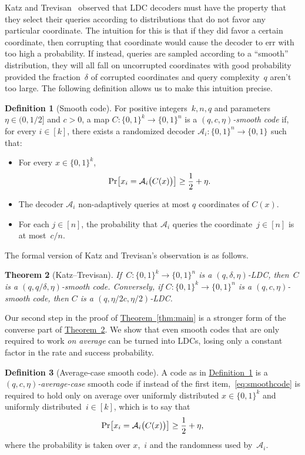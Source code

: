 \documentclass[11pt]{article}
\numberwithin{equation}{section}
\newtheorem{theorem}{Theorem}[section]
\theoremstyle{definition}
\newtheorem{definition}[theorem]{Definition}
\theoremstyle{plain}
\newcommand{\expref}[2]{\hyperref[#2]{#1~\ref{#2}}}
\newcommand{\bset}[1]{\{0,1\}^{#1}} %
\renewcommand{\Pr}{\mbox{\rm Pr}}
\newcommand{\cA}{{\mathcal A}}
\newcommand{\beq}{\begin{equation}}
\newcommand{\eeq}{\end{equation}}
\newcommand{\beqn}{\begin{equation*}}
\newcommand{\eeqn}{\end{equation*}}
\begin{document}
Katz and Trevisan~\cite{Katz:2000} observed that LDC decoders must have the property that they select their queries according to distributions that do not favor any particular coordinate.
The intuition for this is that if they did favor a certain coordinate, then corrupting that coordinate would cause the decoder to err with too high a probability.
If instead, queries are sampled according to a ``smooth'' distribution, they will all fall on uncorrupted coordinates with good probability provided the fraction~$\delta$ of corrupted coordinates %
and query complexity~$q$ aren't too large.
The following definition allows us to make this intuition precise.

\begin{definition}[Smooth code]\label{def:smoothcode}
For positive integers~$k, n,q$ and parameters $\eta\in (0,1/2]$ and $c>0$, a map $C: \bset{k}\to\bset{n}$ is a \emph{$(q,c,\eta)$-smooth code} if, for every $i\in[k]$, there exists a randomized decoder $\mathcal A_i:\bset{n}\to\bset{}$ such that:
\begin{itemize}
\item For every $x\in\bset{k}$,
	\beq\label{eq:smoothcode}
	\Pr\big[x_i=\cA_i\big(C(x)\big)\big]\ge \frac{1}{2}+\eta.
	\eeq
\item The decoder $\mathcal{A}_i$ non-adaptively queries at most $q$ coordinates of $C(x)$.
\item For each $j\in[n]$, the probability that $\mathcal A_i$ queries the coordinate~$j\in[n]$ is at most~$c/n$.
\end{itemize}
\end{definition}

The formal version of Katz and Trevisan's observation is as follows.

%
%
\begin{theorem}[Katz--Trevisan]
\label{thm:ldctosmooth}
If~$C:\bset{k}\to\bset{n}$ is a $(q,\delta,\eta)$-LDC, 
then~$C$ is
%
%
a $(q,q/\delta,\eta)$-smooth code. 
Conversely, if $C:\bset{k}\to\bset{n}$ is a $(q,c,\eta)$-smooth code,
then $C$ is
%
%
a $(q,\eta/2c,\eta/2)$-LDC. 
\end{theorem}

Our second step in the proof of \expref{Theorem}{thm:main} is a stronger form of the converse part of \expref{Theorem}{thm:ldctosmooth}. We show that even smooth codes that are only required to work \emph{on average} can be turned into LDCs, losing only a constant factor in the rate and success probability.

\begin{definition}[Average-case smooth code]
A code as in \expref{Definition}{def:smoothcode} is a \emph{$(q,c,\eta)$-average-case} smooth code if instead of the first item,~\eqref{eq:smoothcode} is required to hold only on average over uniformly distributed $x\in\bset{k}$ and uniformly distributed~$i\in[k]$,
which is to say that
\beqn
\Pr\big[x_i = \mathcal A_i\big(C(x)\big)\big] \geq \frac{1}{2} + \eta,
\eeqn
where the probability is taken over $x$,~$i$ and the randomness used by~$\mathcal A_i$.
\end{definition}
\end{document}
